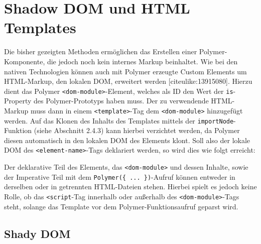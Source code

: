 \section{Shadow DOM und HTML
Templates}\label{shadow-dom-und-html-templates}

Die bisher gezeigten Methoden ermöglichen das Erstellen einer
Polymer-Komponente, die jedoch noch kein internes Markup beinhaltet. Wie
bei den nativen Technologien können auch mit Polymer erzeugte Custom
Elements um HTML-Markup, den lokalen DOM, erweitert werden
{[}citeulike:13915080{]}. Hierzu dient das Polymer
\texttt{\textless{}dom-module\textgreater{}}-Element, welches als ID den
Wert der \texttt{is}-Property des Polymer-Prototyps haben muss. Der zu
verwendende HTML-Markup muss dann in einem
\texttt{\textless{}template\textgreater{}}-Tag dem
\texttt{\textless{}dom-module\textgreater{}} hinzugefügt werden. Auf das
Klonen des Inhalts des Templates mittels der
\texttt{importNode}-Funktion (siehe Abschnitt 2.4.3) kann hierbei
verzichtet werden, da Polymer diesen automatisch in den lokalen DOM des
Elements klont. Soll also der lokale DOM des
\texttt{\textless{}element-name\textgreater{}}-Tags deklariert werden,
so wird dies wie folgt erreicht:

\begin{Shaded}
\begin{Highlighting}[]
\KeywordTok{>}

    \NormalTok{(}\OperatorTok{\{}
      \OperatorTok{:} 
    \OperatorTok{\}}\NormalTok{)}\OperatorTok{;}
  \OperatorTok{<}
\OperatorTok{-}\OperatorTok{>}
\end{Highlighting}
\end{Shaded}

Der deklarative Teil des Elements, das
\texttt{\textless{}dom-module\textgreater{}} und dessen Inhalte, sowie
der Imperative Teil mit dem \texttt{Polymer(\{\ ...\ \})}-Aufruf können
entweder in derselben oder in getrennten HTML-Dateien stehen. Hierbei
spielt es jedoch keine Rolle, ob das \texttt{\textless{}script}-Tag
innerhalb oder außerhalb des
\texttt{\textless{}dom-module\textgreater{}}-Tags steht, solange das
Template vor dem Polymer-Funktionsaufruf geparst wird.

\subsection{Shady DOM}\label{shady-dom}

